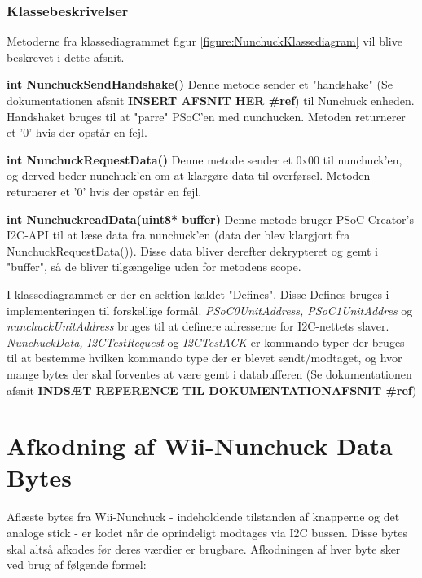 \subsubsection{Klassebeskrivelser}
Metoderne fra klassediagrammet figur \ref{figure:NunchuckKlassediagram} vil blive beskrevet i dette afsnit.

\noindent\textbf{int NunchuckSendHandshake()}\newline
Denne metode sender et "handshake" (Se dokumentationen afsnit \textbf{INSERT AFSNIT HER \#ref}) til Nunchuck enheden. Handshaket bruges til at "parre" PSoC'en med nunchucken. Metoden returnerer et '0' hvis der opstår en fejl. \newline

\noindent\textbf{int NunchuckRequestData()}\newline
Denne metode sender et 0x00 til nunchuck'en, og derved beder nunchuck'en om at klargøre data til overførsel. Metoden returnerer et '0' hvis der opstår en fejl. \newline

\noindent\textbf{int NunchuckreadData(uint8* buffer)}\newline
Denne metode bruger PSoC Creator's I2C-API til at læse data fra nunchuck'en (data der blev klargjort fra NunchuckRequestData()). Disse data bliver derefter dekrypteret og gemt i "buffer", så de bliver tilgængelige uden for metodens scope. \newline

I klassediagrammet er der en sektion kaldet "Defines". Disse Defines bruges i implementeringen til forskellige formål. \textit{PSoC0UnitAddress, PSoC1UnitAddres} og \textit{nunchuckUnitAddress} bruges til at definere adresserne for I2C-nettets slaver. \textit{NunchuckData, I2CTestRequest} og \textit{I2CTestACK} er kommando typer der bruges til at bestemme hvilken kommando type der er blevet sendt/modtaget, og hvor mange bytes der skal forventes at være gemt i databufferen (Se dokumentationen afsnit \textbf{INDSÆT REFERENCE TIL DOKUMENTATIONAFSNIT \#ref}) 



\section{Afkodning af Wii-Nunchuck Data Bytes}
Aflæste bytes fra Wii-Nunchuck - indeholdende tilstanden af knapperne og det analoge stick - er kodet når de oprindeligt modtages via I2C bussen. Disse bytes skal altså afkodes før deres værdier er brugbare. Afkodningen af hver byte sker ved brug af følgende formel:

